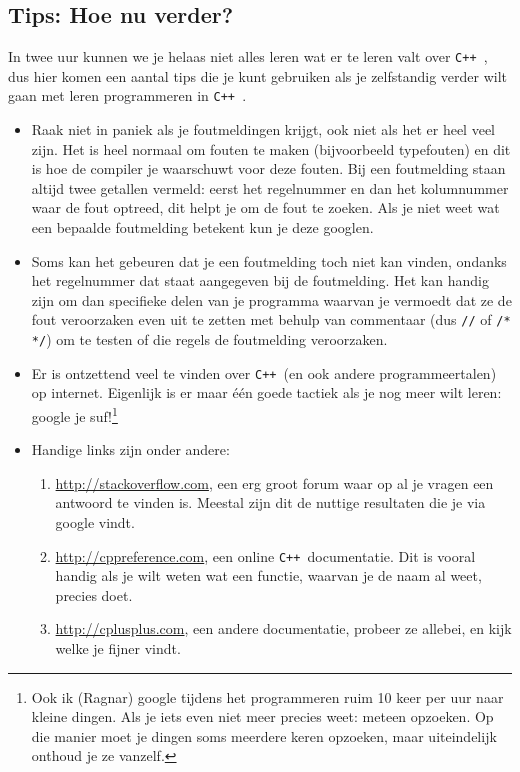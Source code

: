 \documentclass[12pt,a4paper]{article}
\newcommand{\icode}{\lstinline}
\newcommand{\mono}{\texttt}
\newcommand{\cpp}{\mono{C++ }}
\begin{document}
\subsection{Tips: Hoe nu verder?}
In twee uur kunnen we je helaas niet alles leren wat er te leren valt over \cpp, dus hier komen een aantal tips die je kunt gebruiken als je zelfstandig verder wilt gaan met leren programmeren in \cpp. 
\begin{itemize}
	\item Raak niet in paniek als je foutmeldingen krijgt, ook niet als het er heel veel zijn. Het is heel normaal om fouten te maken (bijvoorbeeld typefouten) en dit is hoe de compiler je waarschuwt voor deze fouten. Bij een foutmelding staan altijd twee getallen vermeld: eerst het regelnummer en dan het kolumnummer waar de fout optreed, dit helpt je om de fout te zoeken. Als je niet weet wat een bepaalde foutmelding betekent kun je deze googlen.
	\item Soms kan het gebeuren dat je een foutmelding toch niet kan vinden, ondanks het regelnummer dat staat aangegeven bij de foutmelding. Het kan handig zijn om dan specifieke delen van je programma waarvan je vermoedt dat ze de fout veroorzaken even uit te zetten met behulp van commentaar (dus \icode{//} of \icode{/* */}) om te testen of die regels de foutmelding veroorzaken. 
	\item Er is ontzettend veel te vinden over \cpp (en ook andere programmeertalen) op internet. Eigenlijk is er maar \'e\'en goede tactiek als je nog meer wilt leren: google je suf!\footnote{
			Ook ik (Ragnar) google tijdens het programmeren ruim 10 keer per uur naar kleine dingen. Als je iets even niet meer precies weet: meteen opzoeken. Op die manier moet je dingen soms meerdere keren opzoeken, maar uiteindelijk onthoud je ze vanzelf.
		}
	\item Handige links zijn onder andere:
		\begin{enumerate}
				\item
					\url{http://stackoverflow.com}, een erg groot forum waar op al je vragen een antwoord te vinden is.
					Meestal zijn dit de nuttige resultaten die je via google vindt.
				\item
					\url{http://cppreference.com}, een online \cpp documentatie. Dit is vooral handig als je wilt weten wat een functie, waarvan je de naam al weet, precies doet.
				\item 
					\url{http://cplusplus.com}, een andere documentatie, probeer ze allebei, en kijk welke je fijner vindt.
	\end{enumerate}

\end{itemize}
\end{document}
